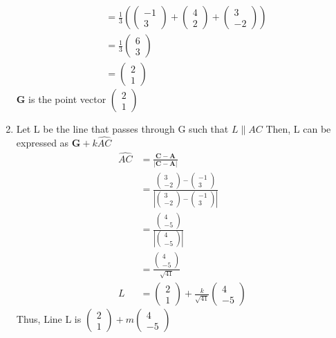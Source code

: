 \documentclass[journal,12pt,twocolumn]{IEEEtran}
\let\vec\mathbf
\providecommand{\abs}[1]{\left\vert#1\right\vert}
\newcommand{\myvec}[1]{\ensuremath{\begin{pmatrix}#1\end{pmatrix}}}
\begin{document}
\begin{enumerate}
\begin{align}
        \\
        &= \frac{1}{3}(\myvec{-1 \\ 3} + \myvec{4 \\ 2} + \myvec{3 \\ -2})
        \\
        &=\frac{1}{3}\myvec{6 \\ 3}
        \\
        &= \myvec{2 \\ 1}
    \end{align}
    $\vec{G}$ is the point vector $\myvec{2 \\ 1}$
\item Let L be the line that passes through G such that $L \parallel AC$
    Then, L can be expressed as $\vec{G} + k\hat{AC}$
    \begin{align}
        \hat{AC} &= \frac{\vec{C} - \vec{A}}{\abs{\vec{C} - \vec{A}}}
		\\        
        &= \frac{\myvec{3 \\ -2} - \myvec{-1 \\ 3}}{\abs{\myvec{3 \\ -2} - \myvec{-1 \\ 3}}}
        \\
        &= \frac{\myvec{4 \\ -5}}{\abs{\myvec{4 \\ -5}}}
		\\        
        &= \frac{\myvec{4 \\ -5}}{\sqrt{41}}
        \\
        L &= \myvec{2 \\ 1} + \frac{k}{\sqrt{41}}\myvec{4 \\ -5}
    \end{align}
    Thus, Line L is $\myvec{2 \\ 1} + m\myvec{4 \\ -5}$
\end{enumerate}
\end{document}
